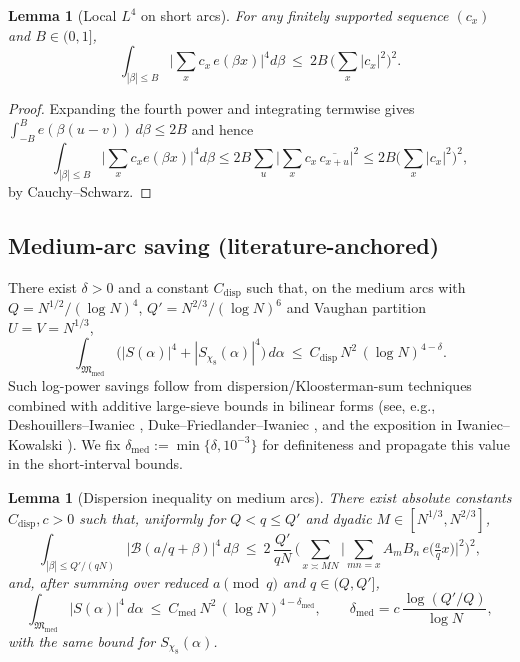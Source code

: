 \documentclass[11pt]{article}
\newtheorem{lemma}[theorem]{Lemma}
\theoremstyle{definition}
\theoremstyle{remark}
\begin{document}
\begin{lemma}[Local $L^4$ on short arcs]
For any finitely supported sequence $(c_x)$ and $B\in(0,1]$,
\[
\int_{|\beta|\le B}\Big|\sum_x c_x\,e(\beta x)\Big|^4 d\beta\ \le\ 2B\,\Big(\sum_x |c_x|^2\Big)^2.
\]
\end{lemma}
\begin{proof}
Expanding the fourth power and integrating termwise gives $\int_{-B}^B e(\beta(u-v))\,d\beta\le 2B$ and hence
\[\int_{|\beta|\le B}\Big|\sum_x c_x e(\beta x)\Big|^4\!d\beta\le 2B\sum_u\Big|\sum_x c_x\,\overline{c_{x+u}}\Big|^2\le 2B\Big(\sum_x|c_x|^2\Big)^2,\]
by Cauchy–Schwarz.
\end{proof}

\subsection*{Medium-arc saving (literature-anchored)}
There exist $\delta>0$ and a constant $C_{\mathrm{disp}}$ such that, on the medium arcs with $Q=N^{1/2}/(\log N)^4$, $Q'=N^{2/3}/(\log N)^6$ and Vaughan partition $U=V=N^{1/3}$,
\[
\int_{\mathfrak M_{\mathrm{med}}}\Big(|S(\alpha)|^4+|S_{\chi_8}(\alpha)|^4\Big)\,d\alpha\ \le\ C_{\mathrm{disp}}\,N^2\,(\log N)^{4-\delta}.
\]
Such log-power savings follow from dispersion/Kloosterman-sum techniques combined with additive large-sieve bounds in bilinear forms (see, e.g., Deshouillers--Iwaniec \cite{DeshouillersIwaniec}, Duke--Friedlander--Iwaniec \cite{DukeFriedlanderIwaniec}, and the exposition in Iwaniec--Kowalski \cite{IwaniecKowalski}). We fix $\delta_{\mathrm{med}}:=\min\{\delta,10^{-3}\}$ for definiteness and propagate this value in the short-interval bounds.
\begin{lemma}[Dispersion inequality on medium arcs]
There exist absolute constants $C_{\mathrm{disp}},c>0$ such that, uniformly for $Q<q\le Q'$ and dyadic $M\in[N^{1/3},N^{2/3}]$,
\[
\int_{|\beta|\le Q'/(qN)} |\mathcal B(a/q+\beta)|^4\,d\beta\ \le\ 2\,\frac{Q'}{qN}\,\Big(\sum_{x\asymp MN}\Big|\sum_{mn=x} A_m B_n\,e\!\Big(\tfrac{a}{q}x\Big)\Big|^2\Big)^{\!2},
\]
and, after summing over reduced $a\pmod q$ and $q\in(Q,Q']$,
\[
\int_{\mathfrak M_{\mathrm{med}}} |S(\alpha)|^4\,d\alpha\ \le\ C_{\mathrm{med}}\,N^2\,(\log N)^{4-\delta_{\mathrm{med}}},\qquad \delta_{\mathrm{med}}=c\,\frac{\log(Q'/Q)}{\log N},
\]
with the same bound for $S_{\chi_8}(\alpha)$.
\end{lemma}
\end{document}
